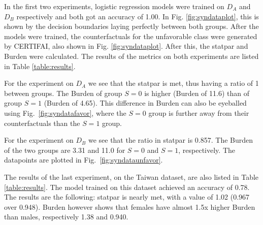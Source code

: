 \documentclass[runningheads]{llncs}
\begin{document}
In the first two experiments, logistic regression models were trained on $D_A$
and $D_B$ respectively and both got an accuracy of 1.00. In Fig.
\ref{fig:syndataplot}, this is shown by the decision boundaries laying
perfectly between both groups. After the models were trained, the
counterfactuals for the unfavorable class were generated by CERTIFAI, also
shown in Fig. \ref{fig:syndataplot}. After this, the \gls{statpar} and
\gls{Burden} were calculated. The results of the metrics on both experiments
are listed in Table \ref{table:results}.

For the experiment on $D_A$ we see that the \gls{statpar} is met, thus having a
ratio of 1 between groups. The Burden of group $S=0$ is higher (Burden of 11.6)
than of group $S=1$ (Burden of 4.65). This difference in Burden can also be
eyeballed using Fig.~\ref{fig:syndatafavor}, where the $S=0$ group is further
away from their counterfactuals than the $S=1$ group.

For the experiment on $D_B$ we see that the ratio in \gls{statpar} is 0.857.
The Burden of the two groups are 3.31 and 11.0 for $S=0$ and $S=1$,
respectively. The datapoints are plotted in Fig.~\ref{fig:syndataunfavor}.

The results of the last experiment, on the Taiwan dataset, are also listed in
Table \ref{table:results}. The model trained on this dataset achieved an
accuracy of 0.78. The results are the following: \Gls{statpar} is nearly met,
with a value of 1.02 (0.967 over 0.948). \Gls{Burden} however shows that
females have almost 1.5x higher Burden than males, respectively 1.38 and 0.940.
\end{document}
